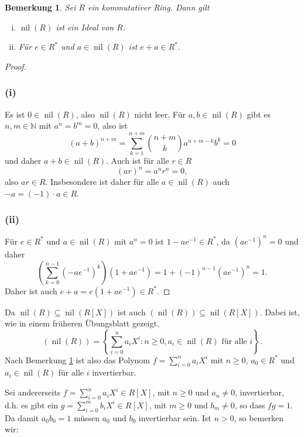 \documentclass[a4paper,10pt]{article}
\newcounter{satze}
\newtheorem{bem}[satze]{Bemerkung}
\theoremstyle{definition}
\newcommand{\N}{\mathbb{N}}
\newcommand{\nil}{\operatorname{nil}}
\begin{document}
\begin{bem}\label{bem: nilradikal}
 Sei $R$ ein kommutativer Ring. Dann gilt
 \begin{enumerate}[(i)]
  \item $\nil(R)$ ist ein Ideal von $R$.
  \item Für $e \in R^*$ und $a \in \nil(R)$ ist $e+a \in R^*$.
 \end{enumerate}
\end{bem}

\begin{proof}
 \subsubsection*{(i)}
  Es ist $0 \in \nil(R)$, also $\nil(R)$ nicht leer. Für $a,b \in \nil(R)$ gibt es $n,m \in \N$ mit $a^n = b^m = 0$, also ist
  \[
   (a+b)^{n+m} = \sum_{k=1}^{n+m} \binom{n+m}{k} a^{n+m-k} b^k = 0
  \]
  und daher $a+b \in \nil(R)$. Auch ist für alle $r \in R$
  \[
   (ar)^n = a^n r^n = 0,
  \]
  also $ar \in R$. Insbesondere ist daher für alle $a \in \nil(R)$ auch $-a = (-1) \cdot a \in R$.
 \subsubsection*{(ii)}
  Für $e \in R^*$ und $a \in \nil(R)$ mit $a^n = 0$ ist $1-ae^{-1} \in R^*$, da $\left(ae^{-1}\right)^n = 0$ und daher
  \[
   \left(\sum_{k=0}^{n-1} \left(-ae^{-1}\right)^k\right) \left(1+ae^{-1}\right)
   = 1+ (-1)^{n-1} \left(ae^{-1}\right)^n
   = 1.
  \]
  Daher ist auch $e+a = e\left(1+ae^{-1}\right) \in R^*$.
\end{proof}

Da $\nil(R) \subseteq \nil(R[X])$ ist auch $\left(\nil(R)\right) \subseteq \nil(R[X])$. Dabei ist, wie in einem früheren Übungsblatt gezeigt,
\[
 \left(\nil(R)\right)
 = \left\{\sum_{i=0}^n a_i X^i : n \geq 0, a_i \in \nil(R) \text{ für alle } i\right\}.
\]
Nach Bemerkung \ref{bem: nilradikal} ist also das Polynom $f = \sum_{i=0}^n a_i X^i$ mit $n \geq 0$, $a_0 \in R^*$ und $a_i \in \nil(R)$ für alle $i$ invertierbar.

Sei andererseits $f = \sum_{i=0}^n a_i X^i \in R[X]$, mit $n \geq 0$ und $a_n \neq 0$, invertierbar, d.h. es gibt ein $g = \sum_{i=0}^m b_i X^i \in R[X]$, mit $m \geq 0$ und $b_m \neq 0$, so dass $fg = 1$. Da damit $a_0 b_0 = 1$ müssen $a_0$ und $b_0$ invertierbar sein. Ist $n > 0$, so bemerken wir:
\end{document}
